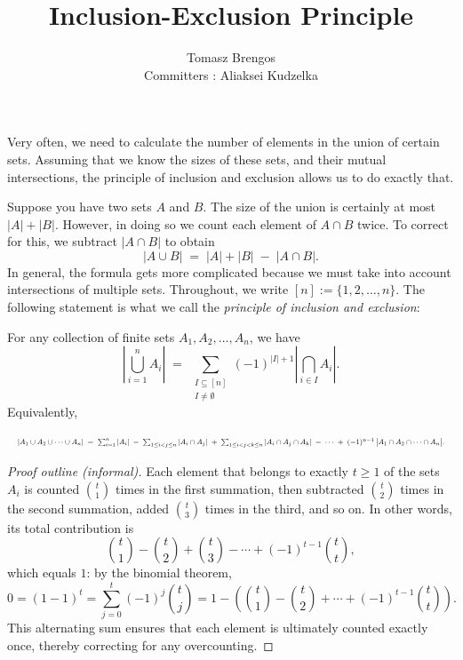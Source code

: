 \documentclass[docmute]{article}
\title{Inclusion-Exclusion Principle}
\author{Tomasz Brengos \\  
Committers : Aliaksei Kudzelka}
\date{}
\begin{document}
\maketitle 
\noindent
Very often, we need to calculate the number of elements in the union of certain sets.
Assuming that we know the sizes of these sets, and their mutual intersections, the principle of
inclusion and exclusion allows us to do exactly that.

\medskip

Suppose you have two sets \(A\) and \(B\). The size of the union is certainly at most \(\lvert A\rvert + \lvert B\rvert\). However, in doing so we count each element of \(A \cap B\) twice. To correct for this, we subtract \(\lvert A \cap B\rvert\) to obtain
\[
|A \cup B| \;=\; |A| + |B| \;-\; |A \cap B|.
\]
In general, the formula gets more complicated because we must take into account intersections of multiple sets. Throughout, we write \([n] := \{1,2,\dots,n\}\). The following statement is what we call the \emph{principle of inclusion and exclusion}:

\begin{lemma}
\label{lem:PIE}
For any collection of finite sets \(A_1, A_2, \ldots, A_n\), we have
\[
\left|\bigcup_{i=1}^{n} A_i\right|
\;=\;
\sum_{\substack{I \subseteq [n] \\ I \neq \emptyset}}
(-1)^{\lvert I\rvert + 1}
\left|\bigcap_{i \in I} A_i\right|.
\]
Equivalently,

\[
\resizebox{\textwidth}{!}{$
|A_1 \cup A_2 \cup \cdots \cup A_n|
\;=\;
\sum_{i=1}^n |A_i|
\;-\;
\sum_{1 \le i < j \le n} |A_i \cap A_j|
\;+\;
\sum_{1 \le i < j < k \le n} |A_i \cap A_j \cap A_k|
\;-\;\cdots\;
+\;
(-1)^{n-1}\,\bigl|A_1 \cap A_2 \cap \cdots \cap A_n\bigr|.
$}
\]
\end{lemma}

\begin{proof}[Proof outline (informal)]
Each element that belongs to exactly \(t \ge 1\) of the sets \(A_i\) is counted \(\binom{t}{1}\) times in the first summation, then subtracted \(\binom{t}{2}\) times in the second summation, added \(\binom{t}{3}\) times in the third, and so on. In other words, its total contribution is
\[
\binom{t}{1} - \binom{t}{2} + \binom{t}{3} - \cdots + (-1)^{t-1}\binom{t}{t},
\]
which equals \(1\): by the binomial theorem,
\[
0 = (1-1)^t = \sum_{j=0}^{t} (-1)^j \binom{t}{j}
= 1 - \left( \binom{t}{1} - \binom{t}{2} + \cdots + (-1)^{t-1}\binom{t}{t} \right).
\]
This alternating sum ensures that each element is ultimately counted exactly once, thereby correcting for any overcounting.
\end{proof}
\end{document}

